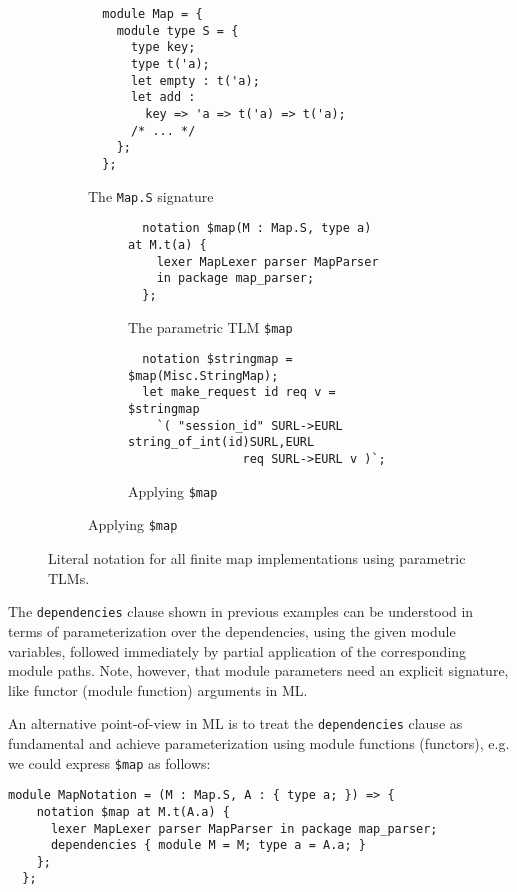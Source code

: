 \documentclass[acmsmall]{acmart}
\newcommand{\li}[1]{\lstinline[basicstyle=\ttfamily\fontsize{9pt}{1em}\selectfont]{#1}}
\begin{document}
\begin{figure}
\begin{subfigure}[t]{0.4\textwidth}
\begin{lstlisting}
  module Map = { 
    module type S = {
      type key;
      type t('a);
      let empty : t('a);
      let add : 
        key => 'a => t('a) => t('a);
      /* ... */
    };
  };
\end{lstlisting}
\vspace{-7px}
\caption{The \li{Map.S} signature}
\label{fig:map-sig}
\end{subfigure}
\hfill
\begin{subfigure}[t]{0.55\textwidth}
\begin{subfigure}[t]{\textwidth}
\begin{lstlisting}
  notation $map(M : Map.S, type a) at M.t(a) {
    lexer MapLexer parser MapParser 
    in package map_parser;
  };
\end{lstlisting}
\vspace{-8px}
\caption{The parametric TLM \li{$map}}
\vspace{5px}
\label{fig:map-tlm}
\end{subfigure}
\begin{subfigure}[b]{\textwidth}
\begin{lstlisting}
  notation $stringmap = $map(Misc.StringMap);
  let make_request id req v = $stringmap
    `( "session_id" SURL->EURL string_of_int(id)SURL,EURL
                req SURL->EURL v )`;
\end{lstlisting}
\vspace{-4px}
\caption{Applying \li{$map}}
\label{fig:map-ap}
\end{subfigure}
\end{subfigure}
\vspace{4px}
\caption{Literal notation for all finite map implementations using parametric TLMs.}
\vspace{-5px}
\label{fig:map-fig}
\end{figure}

The \li{dependencies} clause shown in previous examples can be understood in terms of parameterization over the dependencies, using the given module variables, followed immediately by partial application of the corresponding module paths. Note, however, that module parameters need an explicit signature, like functor (module function) arguments in ML.

An alternative point-of-view in ML is to treat the \li{dependencies} clause as fundamental and achieve parameterization using module functions (functors), e.g. we could express \li{$map} as follows:
\begin{lstlisting}[numbers=none]
  module MapNotation = (M : Map.S, A : { type a; }) => {
    notation $map at M.t(A.a) { 
      lexer MapLexer parser MapParser in package map_parser;
      dependencies { module M = M; type a = A.a; } 
    };
  };
\end{lstlisting}
\end{document}
